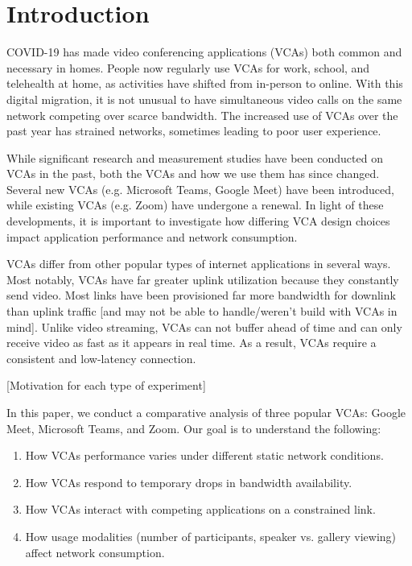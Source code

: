\section{Introduction}\label{sec:intro}
COVID-19 has made video conferencing applications (VCAs) both common and necessary in homes. People now regularly use VCAs for work, school, and telehealth at home, as activities have shifted from in-person to online. With this digital migration, it is not unusual to have simultaneous video calls on the same network competing over scarce bandwidth. The increased use of VCAs over the past year has strained networks, sometimes leading to poor user experience. 

While significant research and measurement studies have been conducted on VCAs in the past, both the VCAs and how we use them has since changed. Several new VCAs (e.g. Microsoft Teams, Google Meet) have been introduced, while existing VCAs (e.g. Zoom) have undergone a renewal. In light of these developments, it is important to investigate how differing VCA design choices impact application performance and network consumption. 

VCAs differ from other popular types of internet applications in several ways. Most notably, VCAs have far greater uplink utilization because they constantly send video. Most links have been provisioned far more bandwidth for downlink than uplink traffic [and may not be able to handle/weren't build with VCAs in mind]. Unlike video streaming, VCAs can not buffer ahead of time and can only receive video as fast as it appears in real time. As a result, VCAs require a consistent and low-latency connection. 

[Motivation for each type of experiment]

In this paper, we conduct a comparative analysis of three popular VCAs: Google Meet, Microsoft Teams, and Zoom. Our goal is to understand the following:
\begin{enumerate}
    \item How VCAs performance varies under different static network conditions.
    \item How VCAs respond to temporary drops in bandwidth availability.
    \item How VCAs interact with competing applications on a constrained link.
    \item How usage modalities (number of participants, speaker vs. gallery viewing) affect network consumption.
\end{enumerate}







